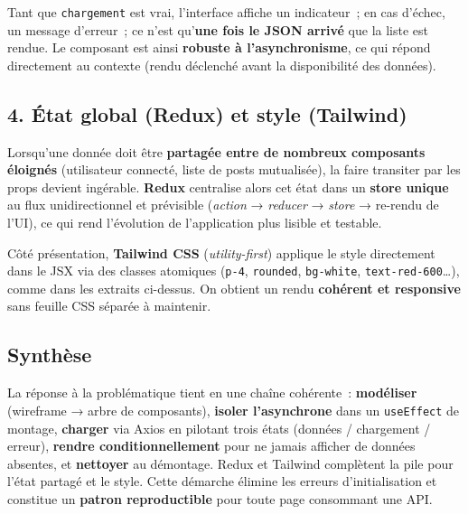 \noindent Tant que \texttt{chargement} est vrai, l'interface affiche un indicateur~; en cas d'échec, un message d'erreur~; ce n'est qu'\textbf{une fois le JSON arrivé} que la liste est rendue. Le composant est ainsi \textbf{robuste à l'asynchronisme}, ce qui répond directement au contexte (rendu déclenché avant la disponibilité des données).

\newpage

\subsection*{4. État global (Redux) et style (Tailwind)}
{}
\noindent Lorsqu'une donnée doit être \textbf{partagée entre de nombreux composants éloignés} (utilisateur connecté, liste de posts mutualisée), la faire transiter par les props devient ingérable. \textbf{Redux} centralise alors cet état dans un \textbf{store unique} au flux unidirectionnel et prévisible (\textit{action} → \textit{reducer} → \textit{store} → re-rendu de l'UI), ce qui rend l'évolution de l'application plus lisible et testable.

\vspace{0.2cm}

\noindent Côté présentation, \textbf{Tailwind CSS} (\textit{utility-first}) applique le style directement dans le JSX via des classes atomiques (\texttt{p-4}, \texttt{rounded}, \texttt{bg-white}, \texttt{text-red-600}…), comme dans les extraits ci-dessus. On obtient un rendu \textbf{cohérent et responsive} sans feuille CSS séparée à maintenir.

\vspace{0.4cm}

\subsection*{Synthèse}
{}
\noindent La réponse à la problématique tient en une chaîne cohérente~: \textbf{modéliser} (wireframe → arbre de composants), \textbf{isoler l'asynchrone} dans un \texttt{useEffect} de montage, \textbf{charger} via Axios en pilotant trois états (données / chargement / erreur), \textbf{rendre conditionnellement} pour ne jamais afficher de données absentes, et \textbf{nettoyer} au démontage. Redux et Tailwind complètent la pile pour l'état partagé et le style. Cette démarche élimine les erreurs d'initialisation et constitue un \textbf{patron reproductible} pour toute page consommant une API.

